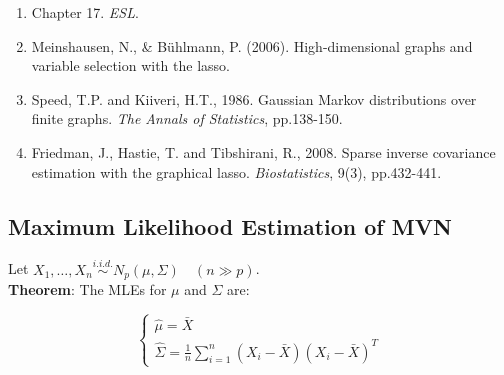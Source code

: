 \documentclass[12pt]{book}
\theoremstyle{definition}
\theoremstyle{remark}
\begin{document}
\begin{referencebox}
\begin{enumerate}
    \item Chapter 17. \textit{ESL}.
    \item Meinshausen, N., \& Bühlmann, P. (2006). High-dimensional graphs and variable selection with the lasso.
    \item Speed, T.P. and Kiiveri, H.T., 1986. Gaussian Markov distributions over finite graphs. \textit{The Annals of Statistics}, pp.138-150.
    \item Friedman, J., Hastie, T. and Tibshirani, R., 2008. Sparse inverse covariance estimation with the graphical lasso. \textit{Biostatistics}, 9(3), pp.432-441.
\end{enumerate}
\end{referencebox}


\subsection{Maximum Likelihood Estimation of MVN}
Let \( X_1, \dots, X_n \overset{i.i.d.}{\sim} N_p(\mu, \Sigma) \quad (n \gg p) \).\\

\textbf{Theorem}: The MLEs for \( \mu \) and \( \Sigma \) are:

\[\begin{cases}
\hat{\mu} = \bar{X}\\
\hat{\Sigma} = \frac{1}{n} \sum_{i=1}^{n} (X_i - \bar{X}) (X_i - \bar{X})^T\end{cases}
\]
\end{document}
